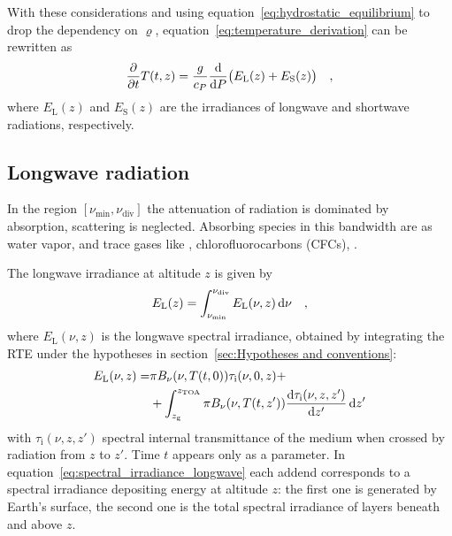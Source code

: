 \documentclass[a4paper,10pt,twocolumn,\classoptions]{article}
\newcommand{\zTOA}{z_\text{TOA}}
\begin{document}
With these considerations and using equation~\eqref{eq:hydrostatic_equilibrium} to drop the dependency on $\varrho$, equation~\eqref{eq:temperature_derivation} can be rewritten as
\begin{equation}
  \label{eq:temperature_time_derivative}
  \pdv*{T(t,z)}{t} = \frac{g}{c_P} \odv*{\big( E_\text{L}(z) + E_\text{S}(z) \big)}{P}
  \quad ,
\end{equation}
where $E_\text{L}(z)$ and $E_\text{S}(z)$ are the irradiances of longwave and shortwave radiations, respectively.



\subsection{Longwave radiation}
\label{sec:Longwave radiation}
In the region $[\nu_\text{min}, \nu_\text{div}]$ the attenuation of radiation is dominated by absorption, scattering is neglected.
Absorbing species in this bandwidth are  as water vapor,  and trace gases like , chlorofluorocarbons (CFCs), .

The longwave irradiance at altitude $z$ is given by
\begin{equation}
  \label{eq:irradiance_longwave}
  E_\text{L}(z) = \int_{\nu_\text{min}}^{\nu_\text{div}} E_\text{L}(\nu, z) \odif{\nu}
  \quad ,
\end{equation}
where $E_\text{L}(\nu, z)$ is the longwave spectral irradiance, obtained by integrating the RTE under the hypotheses in section~\ref{sec:Hypotheses and conventions}:
\begin{equation}
  \label{eq:spectral_irradiance_longwave}
  \begin{split}
    E_\text{L}(\nu, z) = & \pi B_\nu(\nu, T(t, 0)) \tau_\text{i}(\nu, 0, z) + \\
    & + \int_{z_\text{g}}^{\zTOA} \pi B_\nu(\nu, T(t, z')) \odv{\tau_\text{i}(\nu, z, z')}{z'} \odif{z'}
  \end{split}
\end{equation}
with $\tau_\text{i}(\nu, z, z')$ spectral internal transmittance of the medium when crossed by radiation from $z$ to $z'$. Time $t$ appears only as a parameter.
In equation~\eqref{eq:spectral_irradiance_longwave} each addend corresponds to a spectral irradiance depositing energy at altitude $z$: the first one is generated by Earth's surface, the second one is the total spectral irradiance of layers beneath and above $z$.
\end{document}
